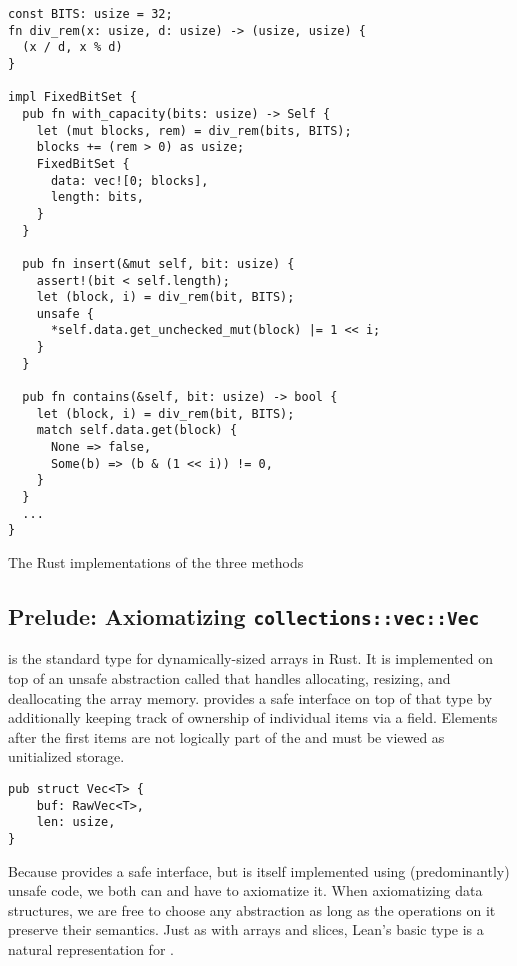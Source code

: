 \begin{listing}[!bt]
\begin{verbatim}
const BITS: usize = 32;
fn div_rem(x: usize, d: usize) -> (usize, usize) {
  (x / d, x % d)
}

impl FixedBitSet {
  pub fn with_capacity(bits: usize) -> Self {
    let (mut blocks, rem) = div_rem(bits, BITS);
    blocks += (rem > 0) as usize;
    FixedBitSet {
      data: vec![0; blocks],
      length: bits,
    }
  }

  pub fn insert(&mut self, bit: usize) {
    assert!(bit < self.length);
    let (block, i) = div_rem(bit, BITS);
    unsafe {
      *self.data.get_unchecked_mut(block) |= 1 << i;
    }
  }

  pub fn contains(&self, bit: usize) -> bool {
    let (block, i) = div_rem(bit, BITS);
    match self.data.get(block) {
      None => false,
      Some(b) => (b & (1 << i)) != 0,
    }
  }
  ...
}
\end{verbatim}

  \caption{The Rust implementations of the three methods}
  \label{lst:fixedbitset}
\end{listing}

\subsection{Prelude: Axiomatizing \texttt{collections::vec::Vec}}

 is the standard type for dynamically-sized arrays in Rust. It is
implemented on top of an unsafe abstraction called  that handles
allocating, resizing, and deallocating the array memory.  provides a
safe interface on top of that type by additionally keeping track of ownership of individual items
via a  field. Elements after the first  items are not
logically part of the  and must be viewed as unitialized storage.

\begin{verbatim}
pub struct Vec<T> {
    buf: RawVec<T>,
    len: usize,
}
\end{verbatim}

Because  provides a safe interface, but is itself implemented using
(predominantly) unsafe code, we both can and have to axiomatize it. When axiomatizing data structures, we are free to choose any abstraction as long
as the operations on it preserve their semantics. Just as with arrays and
slices, Lean's basic  type is a natural representation for
.

